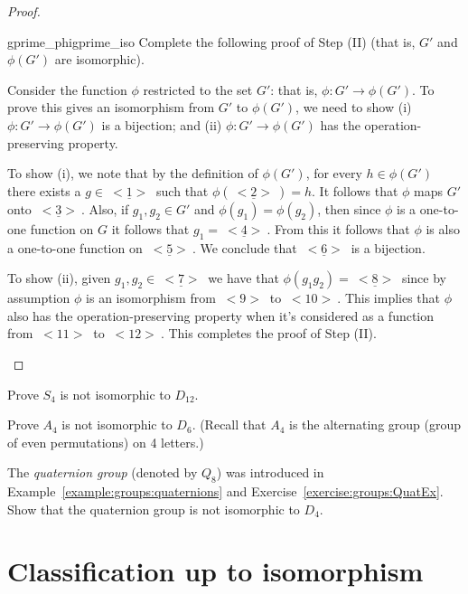 \begin{proof}
\begin{exercise}{gprime_phigprime_iso}
Complete the following proof of Step (II) (that is, $G'$ and $\phi(G')$ are isomorphic). 
\medskip

Consider the function $\phi$ restricted to the set $G'$: that is, $\phi: G' \rightarrow \phi(G')$.  To  prove this gives an isomorphism from $G'$ to $\phi(G')$, we need to show (i) $\phi: G' \rightarrow \phi(G')$ is a bijection; and (ii) $\phi: G' \rightarrow \phi(G')$ has the operation-preserving property.

To show (i), we note that by the definition of $\phi(G')$, for every $h \in \phi(G')$ there exists a $g \in \underline{~<1>~}$ such that $\phi(\underline{~<2>~}) = h$. It follows that $\phi$ maps $G'$ onto $\underline{~<3>~}$.  Also, if $g_1, g_2 \in G'$ and $\phi(g_1) = \phi(g_2)$, then since $\phi$ is a one-to-one function on $G$ it follows that $g_1 = \underline{~<4>~}$. From this it follows that $\phi$ is also a one-to-one function on $\underline{~<5>~}$.  We conclude that $\underline{~<6>~}$ is a bijection.

To show (ii), given $g_1, g_2 \in \underline{~<7>~}$ we have that $\phi(g_1 g_2) = \underline{~<8>~}$ since by assumption $\phi$ is an isomorphism from \underline{$~<9>~$} to \underline{$~<10>~$}. This implies that $\phi$ also has the operation-preserving  property when it's considered as a function from  \underline{$~<11>~$} to \underline{$~<12>~$}.  This completes the proof of Step (II).
 \end{exercise}

\end{proof}

\begin{exercise}{}
Prove $S_4$ is not isomorphic to $D_{12}$. 
\end{exercise}

\begin{exercise}{}
Prove $A_4$ is not isomorphic to $D_{6}$. (Recall that $A_4$ is the alternating group (group of even permutations) on 4 letters.) 
\end{exercise}

\begin{exercise}{}
The \emph{quaternion group} (denoted by $Q_8$) was introduced in Example~\ref{example:groups:quaternions} and Exercise~\ref{exercise:groups:QuatEx}. Show that the quaternion group is not isomorphic to $D_4$.
\end{exercise}

\section{Classification up to isomorphism}
\label{sec:ClassificationIsomorphism}

